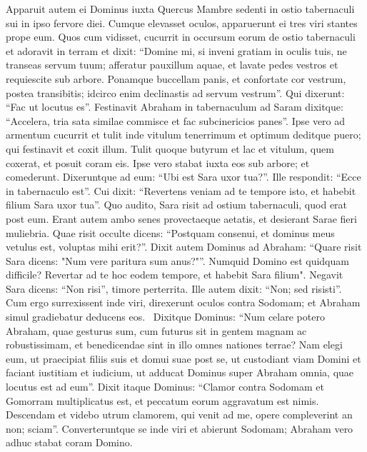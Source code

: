 \begin{biblechapter}  
\verse Apparuit autem ei Dominus iuxta Quercus Mambre sedenti in ostio tabernaculi sui in ipso fervore diei. 
\verse Cumque elevasset oculos, apparuerunt ei tres viri stantes prope eum. Quos cum vidisset, cucurrit in occursum eorum de ostio tabernaculi et adoravit in terram 
\verse et dixit: “Domine mi, si inveni gratiam in oculis tuis, ne transeas servum tuum; 
\verse afferatur pauxillum aquae, et lavate pedes vestros et requiescite sub arbore. 
\verse Ponamque buccellam panis, et confortate cor vestrum, postea transibitis; idcirco enim declinastis ad servum vestrum”. Qui dixerunt: “Fac ut locutus es”. 
\verse Festinavit Abraham in tabernaculum ad Saram dixitque: “Accelera, tria sata similae commisce et fac subcinericios panes”. 
\verse Ipse vero ad armentum cucurrit et tulit inde vitulum tenerrimum et optimum deditque puero; qui festinavit et coxit illum. 
\verse Tulit quoque butyrum et lac et vitulum, quem coxerat, et posuit coram eis. Ipse vero stabat iuxta eos sub arbore; et comederunt. 
\verse Dixeruntque ad eum: “Ubi est Sara uxor tua?”. Ille respondit: “Ecce in tabernaculo est”. 
\verse Cui dixit: “Revertens veniam ad te tempore isto, et habebit filium Sara uxor tua”. Quo audito, Sara risit ad ostium tabernaculi, quod erat post eum. 
\verse Erant autem ambo senes provectaeque aetatis, et desierant Sarae fieri muliebria. 
\verse Quae risit occulte dicens: “Postquam consenui, et dominus meus vetulus est, voluptas mihi erit?”. 
\verse Dixit autem Dominus ad Abraham: “Quare risit Sara dicens: "Num vere paritura sum anus?"”. 
\verse Numquid Domino est quidquam difficile? Revertar ad te hoc eodem tempore, et habebit Sara filium". 
\verse Negavit Sara dicens: “Non risi”, timore perterrita. Ille autem dixit: “Non; sed risisti”. 
\verse Cum ergo surrexissent inde viri, direxerunt oculos contra Sodomam; et Abraham simul gradiebatur deducens eos.  
\verse Dixitque Dominus: “Num celare potero Abraham, quae gesturus sum, 
\verse cum futurus sit in gentem magnam ac robustissimam, et benedicendae sint in illo omnes nationes terrae? 
\verse Nam elegi eum, ut praecipiat filiis suis et domui suae post se, ut custodiant viam Domini et faciant iustitiam et iudicium, ut adducat Dominus super Abraham omnia, quae locutus est ad eum”.
\verse Dixit itaque Dominus: “Clamor contra Sodomam et Gomorram multiplicatus est, et peccatum eorum aggravatum est nimis. 
\verse Descendam et videbo utrum clamorem, qui venit ad me, opere compleverint an non; sciam”. 
\verse Converteruntque se inde viri et abierunt Sodomam; Abraham vero adhuc stabat coram Domino.

\end{biblechapter}
